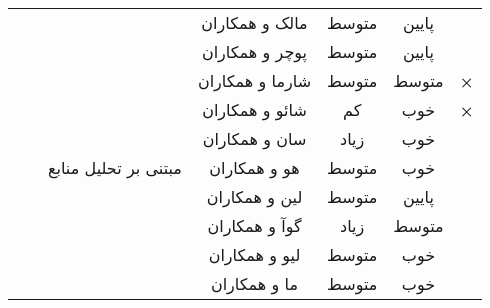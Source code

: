 \begin{table}[]
\begin{tabular}{llccccc}
		&  & \multicolumn{1}{c|}{}                                                                            & \multicolumn{1}{c|}{مالک و همکاران}   & \multicolumn{1}{c|}{متوسط} & \multicolumn{1}{c|}{پایین} & \multicolumn{1}{c|}{\textbf{\checkmark}} \\ \cline{4-7} 
		&  & \multicolumn{1}{c|}{}                                                                            & \multicolumn{1}{c|}{پوچر و همکاران}   & \multicolumn{1}{c|}{متوسط} & \multicolumn{1}{c|}{پایین} & \multicolumn{1}{c|}{\textbf{\checkmark}} \\ \cline{4-7} 
		&  & \multicolumn{1}{c|}{}                                                                            & \multicolumn{1}{c|}{شارما و همکاران}  & \multicolumn{1}{c|}{متوسط} & \multicolumn{1}{c|}{متوسط} & \multicolumn{1}{c|}{\textbf{×}} \\ \cline{3-7} 
		&  & \multicolumn{1}{c|}{}                                                                            & \multicolumn{1}{c|}{شائو و همکاران}   & \multicolumn{1}{c|}{کم}    & \multicolumn{1}{c|}{خوب}   & \multicolumn{1}{c|}{\textbf{×}} \\ \cline{4-7} 
		&  & \multicolumn{1}{c|}{}                                                                            & \multicolumn{1}{c|}{سان و همکاران}    & \multicolumn{1}{c|}{زیاد}  & \multicolumn{1}{c|}{خوب}   & \multicolumn{1}{c|}{\textbf{\checkmark}} \\ \cline{4-7} 
		&  & \multicolumn{1}{c|}{مبتنی بر تحلیل منابع}                                                        & \multicolumn{1}{c|}{هو و همکاران}     & \multicolumn{1}{c|}{متوسط} & \multicolumn{1}{c|}{خوب}   & \multicolumn{1}{c|}{\textbf{\checkmark}} \\ \cline{4-7} 
		&  & \multicolumn{1}{c|}{}                                                                            & \multicolumn{1}{c|}{لین و همکاران}    & \multicolumn{1}{c|}{متوسط} & \multicolumn{1}{c|}{پایین} & \multicolumn{1}{c|}{\textbf{\checkmark}} \\ \cline{4-7} 
		&  & \multicolumn{1}{c|}{}                                                                            & \multicolumn{1}{c|}{گوآ و همکاران}    & \multicolumn{1}{c|}{زیاد}  & \multicolumn{1}{c|}{متوسط} & \multicolumn{1}{c|}{\textbf{\checkmark}} \\ \cline{4-7} 
		&  & \multicolumn{1}{c|}{}                                                                            & \multicolumn{1}{c|}{لیو و همکاران}    & \multicolumn{1}{c|}{متوسط} & \multicolumn{1}{c|}{خوب}   & \multicolumn{1}{c|}{\textbf{\checkmark}} \\ \cline{4-7} 
		&  & \multicolumn{1}{c|}{}                                                                            & \multicolumn{1}{c|}{ما  و همکاران}    & \multicolumn{1}{c|}{متوسط} & \multicolumn{1}{c|}{خوب}   & \multicolumn{1}{c|}{\textbf{\checkmark}} \\ \cline{4-7} 
	\end{tabular}
\end{table}
